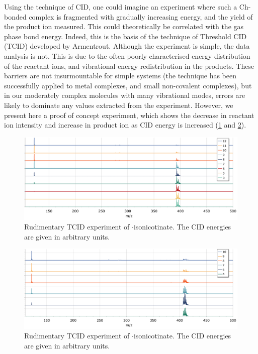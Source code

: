 \begin{refsection}
Using the technique of CID, one could imagine an experiment where such a Ch-bonded complex is fragmented with gradually increasing energy, and the yield of the product ion measured.
This could theoretically be correlated with the gas phase bond energy.
Indeed, this is the basis of the technique of Threshold CID (TCID) developed by Armentrout.\autocite{Armentrout2003,Rodgers2000,Narancic2007}
Although the experiment is simple, the data analysis is not.
This is due to the often poorly characterised energy distribution of the reactant ions, and vibrational energy redistribution in the products.
These barriers are not insurmountable for simple systems (the technique has been successfully applied to metal complexes, and small non-covalent complexes), but in our moderately complex molecules with many vibrational modes, errors are likely to dominate any values extracted from the experiment.
However, we present here a proof of concept experiment, which shows the decrease in reactant ion intensity and increase in product ion as CID energy is increased (\cref{fig:ebs-ph-tcid} and \cref{fig:ebs-bn-tcid}).

\begin{figure}
    \centering
    \includegraphics[width=\linewidth]{Figures/ebs-ph-cid.pdf}
    \caption[TCID experiment of $ \cdot $isonicotinate.]{Rudimentary TCID experiment of $ \cdot $isonicotinate. The CID energies are given in arbitrary units.}\label{fig:ebs-ph-tcid}
\end{figure}

\begin{figure}
  \centering
  \includegraphics[width=\linewidth]{Figures/ebs-bn-cid.pdf}
  \caption[TCID experiment of $ \cdot $isonicotinate.]{Rudimentary TCID experiment of $ \cdot $isonicotinate. The CID energies are given in arbitrary units.}\label{fig:ebs-bn-tcid}
\end{figure}


\end{refsection}
